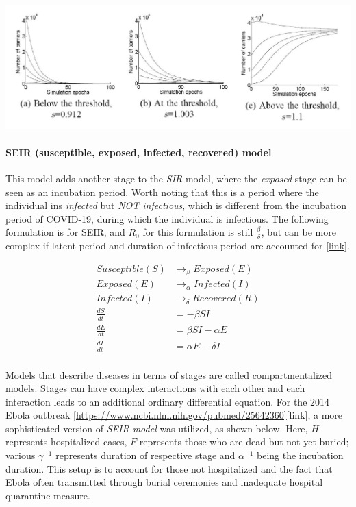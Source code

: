 {
\centering
\includegraphics[width=1.0\textwidth]{notes/img/l13_p26_simulation.JPG} \par
}


\paragraph{SEIR (susceptible, exposed, infected, recovered) model} This model adds another stage to the \textit{SIR} model, where the \textit{exposed} stage can be seen as an incubation period. Worth noting that this is a period where the individual ins \textit{infected} but \textit{NOT infectious}, which is different from the incubation period of COVID-19, during which the individual is infectious. The following formulation is for SEIR, and $R_0$ for this formulation is still $\frac{\beta}{\delta}$, but can be more complex if latent period and duration of infectious period are accounted for \href{https://sites.me.ucsb.edu/~moehlis/APC514/tutorials/tutorial_seasonal/node4.html}{[link]}.

\begin{align}
    Susceptible (S) &\rightarrow_{\beta} Exposed (E) \\
    Exposed (E) &\rightarrow_{\alpha} Infected (I) \\
    Infected (I) &\rightarrow_{\delta} Recovered (R) \\
    \frac{dS}{dt} &= - \beta SI \\
    \frac{dE}{dt} &= \beta SI - \alpha E\\
    \frac{dI}{dt} &= \alpha E - \delta  I \\
\end{align}{}

Models that describe diseases in terms of stages are called compartmentalized models. Stages can have complex interactions with each other and each interaction leads to an additional ordinary differential equation. For the 2014 Ebola outbreak \ref{https://www.ncbi.nlm.nih.gov/pubmed/25642360}{[link]}, a more sophisticated version of \textit{SEIR model} was utilized, as shown below. Here, $H$ represents hospitalized cases, $F$ represents those who are dead but not yet buried; various $\gamma^{-1}$ represents duration of respective stage and $\alpha^{-1}$ being the incubation duration. This setup is to account for those not hospitalized and the fact that Ebola often transmitted through burial ceremonies and inadequate hospital quarantine measure.

